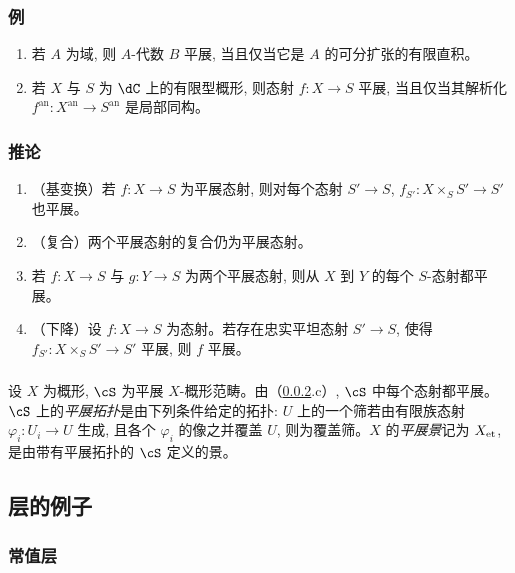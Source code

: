 \subsubsection{例}\label{I:2-1-2}
\begin{enumerate}[\indent a)]
  \item 若 $A$ 为域, 则 $A$-代数 $B$ 平展, 当且仅当它是 $A$ 的可分扩张的有限直积。
  \item 若 $X$ 与 $S$ 为 $\dC$ 上的有限型概形, 则态射 $f:X\to S$ 平展, 当且仅当其解析化 $f^{\text{an}}:X^{\text{an}}\to S^{\text{an}}$ 是局部同构。
\end{enumerate}

\subsubsection{推论}\label{I:2-1-3}
\begin{enumerate}[\indent a)]
  \item （基变换）若 $f:X\to S$ 为平展态射, 则对每个态射 $S'\to S$, $f_{S'}:X\times_SS'\to S'$ 也平展。
  \item （复合）两个平展态射的复合仍为平展态射。
  \item 若 $f:X\to S$ 与 $g:Y\to S$ 为两个平展态射, 则从 $X$ 到 $Y$ 的每个 $S$-态射都平展。
  \item （下降）设 $f:X\to S$ 为态射。若存在忠实平坦态射 $S'\to S$, 使得 $f_{S'}:X\times_SS'\to S'$ 平展, 则 $f$ 平展。
\end{enumerate}

\subsubsection{}\label{I:2-1-4}

设 $X$ 为概形, $\cS$ 为平展 $X$-概形范畴。由（\ref{I:2-1-3}.c）, $\cS$ 中每个态射都平展。$\cS$ 上的\emph{平展拓扑}是由下列条件给定的拓扑: $U$ 上的一个筛若由有限族态射 $\varphi_i:U_i\to U$ 生成, 且各个 $\varphi_i$ 的像之并覆盖 $U$, 则为覆盖筛。$X$ 的\emph{平展景}记为 ${X}_{\textnormal{et}}$, 是由带有平展拓扑的 $\cS$ 定义的景。

\subsection{层的例子}\label{I:2-2}

\subsubsection{常值层}\label{I:2-2-1}

